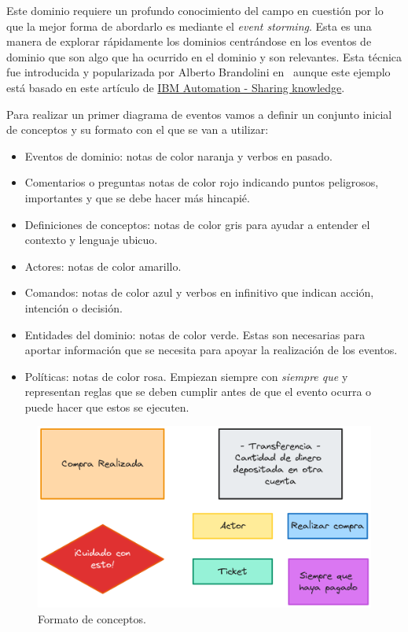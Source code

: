 Este dominio requiere un profundo conocimiento del campo en cuestión por lo que la mejor forma de abordarlo es mediante el \textit{event storming}. Esta es una manera de explorar rápidamente los dominios centrándose en los eventos de dominio que son algo que ha ocurrido en el dominio y son relevantes. Esta técnica fue introducida y popularizada por Alberto Brandolini en~\cite{brandolini2013introducing} aunque este ejemplo está basado en este artículo de \href{https://ibm-cloud-architecture.github.io/refarch-eda/methodology/event-storming/}{IBM Automation - Sharing knowledge}.

Para realizar un primer diagrama de eventos vamos a definir un conjunto inicial de conceptos y su formato con el que se van a utilizar:

\begin{itemize}
    \item Eventos de dominio: notas de color naranja y verbos en pasado.
    \item Comentarios o preguntas notas de color rojo indicando puntos peligrosos, importantes y que se debe hacer más hincapié.
    \item Definiciones de conceptos: notas de color gris para ayudar a entender el contexto y lenguaje ubicuo.
    \item Actores: notas de color amarillo.
    \item Comandos: notas de color azul y verbos en infinitivo que indican acción, intención o decisión.
    \item Entidades del dominio: notas de color verde. Estas son necesarias para aportar información que se necesita para apoyar la realización de los eventos.
    \item Políticas: notas de color rosa. Empiezan siempre con \textit{siempre que} y representan reglas que se deben cumplir antes de que el evento ocurra o puede hacer que estos se ejecuten.
\end{itemize}

\begin{figure}[ht]
    \caption{Formato de conceptos.}
    \centering
    \vspace*{0.5cm}
    \includegraphics[scale=0.25]{figuras/conceptos.png}
\end{figure}


